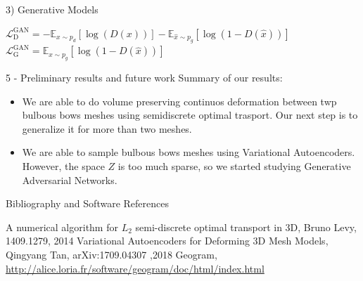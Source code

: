 \documentclass[b0paper,portrait]{baposter}
\begin{document}
\begin{poster}
\begin{posterbox}[name=vae,below=otm,span=6,column=0]{3) Generative Models }
\begin{itemize}
 \begin{minipage}{0.2\textwidth}
{\fontsize{4}{4} \selectfont
$\mathcal{L}_{\mathrm{D}}^{\mathrm{GAN}}=-\mathbb{E}_{x \sim p_{d}}[\log (D(x))]-\mathbb{E}_{\hat{x} \sim p_{g}}[\log (1-D(\hat{x}))]$ \\ $\mathcal{L}_{\mathrm{G}}^{\mathrm{GAN}}=\mathbb{E}_{\hat{x} \sim p_{g}}[\log (1-D(\hat{x}))]$
}
\end{minipage}
\end{itemize}
\end{posterbox}
\begin{posterbox}[name=results,below=vae,span=6,column=0]{5
    - Preliminary results and future work}
Summary of our results:
\begin{itemize}
\item We are able to do volume preserving continuos deformation between twp bulbous bows meshes using semidiscrete optimal trasport. Our next step is to generalize it for more than two meshes.
\item We are able to sample bulbous bows meshes using Variational Autoencoders. However, the space $Z$ is too much sparse, so we started studying Generative Adversarial Networks. 
\end{itemize}
\end{posterbox}
\begin{posterbox}[name=bibliography,below=results,span=6,column=0]{Bibliography and Software References}
\begingroup
\renewcommand{\section}[2]{}%
\begin{thebibliography}{9}
A numerical algorithm for $L_{2}$ semi-discrete optimal transport in 3D, Bruno Levy, 1409.1279, 2014
Variational Autoencoders for Deforming 3D Mesh Models, Qingyang Tan, arXiv:1709.04307 ,2018
Geogram, \url{http://alice.loria.fr/software/geogram/doc/html/index.html}
\end{thebibliography}
\endgroup
\end{posterbox}

\end{poster}
\end{document}
